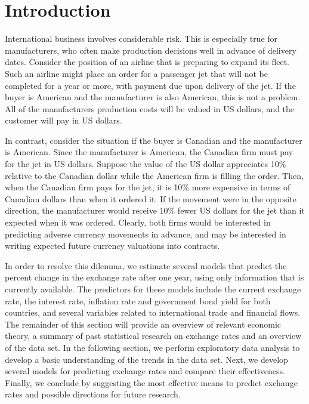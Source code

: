 \documentclass{sig-alternate-05-2015}
\begin{document}
\section{Introduction}
International business involves considerable risk. This is especially true for manufacturers, who often make production decisions well in advance of delivery dates. Consider the position of an airline that is preparing to expand its fleet. Such an airline might place an order for a passenger jet that will not be completed for a year or more, with payment due upon delivery of the jet. If the buyer is American and the manufacturer is also American, this is not a problem. All of the manufacturers production costs will be valued in US dollars, and the customer will pay in US dollars.
\par{} In contrast, consider the situation if the buyer is Canadian and the manufacturer is American. Since the manufacturer is American, the Canadian firm must pay for the jet in US dollars. Suppose the value of the US dollar appreciates 10\% relative to the Canadian dollar while the American firm is filling the order. Then, when the Canadian firm pays for the jet, it is 10\% more expensive in terms of Canadian dollars than when it ordered it. If the movement were in the opposite direction, the manufacturer would receive 10\% fewer US dollars for the jet than it expected when it was ordered. Clearly, both firms would be interested in predicting adverse currency movements in advance, and may be interested in writing expected future currency valuations into contracts. 
\par{} In order to resolve this dilemma, we estimate several models that predict the percent change in the exchange rate after one year, using only information that is currently available. The predictors for these models include the current exchange rate, the interest rate, inflation rate and government bond yield for both countries, and several variables related to international trade and financial flows. The remainder of this section will provide an overview of relevant economic theory, a summary of past statistical research on exchange rates and an overview of the data set. In the following section, we perform exploratory data analysis to develop a basic understanding of the trends in the data set. Next, we develop several models for predicting exchange rates and compare their effectiveness. Finally, we conclude by suggesting the most effective means to predict exchange rates and possible directions for future research.
\end{document}
